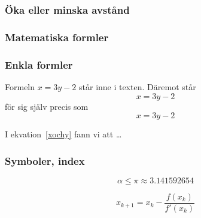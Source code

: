 \begin{frame}[fragile]
  \frametitle{Öka eller minska avstånd}

  \begin{itemize}
  \end{itemize}
\end{frame}


\begin{frame}[fragile]
  \frametitle{Matematiska formler}

  \blankline
  \begin{itemize}
  \end{itemize}

\end{frame}


\begin{frame}[fragile,t]
  \frametitle{Enkla formler}
  \vspace{2em}

  \begin{exlatex}
Formeln $x=3y-2$ står inne i texten. Däremot står
\begin{displaymath}
  x=3y-2
\end{displaymath}
för sig själv precis som
\begin{equation}
  x=3y-2
  \label{xochy}
\end{equation}

I ekvation~\ref{xochy} fann
vi att \ldots
  \end{exlatex}
\end{frame}

\begin{frame}[fragile,t]
  \frametitle{Symboler, index}
  \vspace{2em}

  \begin{exlatex}
\begin{displaymath}
  \alpha \leq \pi \approx 3.141592654
\end{displaymath}
  \end{exlatex}

  \vspace{1cm}

  \begin{exlatex}
\begin{displaymath}
  x_{k+1} =
  x_{k} -
  \frac{f(x_{k})}{f'(x_{k})}
\end{displaymath}
  \end{exlatex}
\end{frame}

